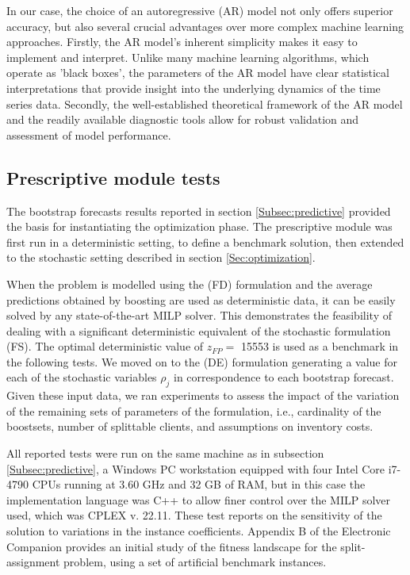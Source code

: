 \documentclass[ijoc,sglanonrev]{informs4}
\begin{document}
In our case, the choice of an autoregressive (AR) model not only offers superior accuracy, but also several crucial advantages over more complex machine learning approaches. Firstly, the AR model's inherent simplicity makes it easy to implement and interpret.  Unlike many machine learning algorithms, which operate as 'black boxes', the parameters of the AR model have clear statistical interpretations that provide insight into the underlying dynamics of the time series data. Secondly, the well-established theoretical framework of the AR model and the readily available diagnostic tools allow for robust validation and assessment of model performance.  

\subsection{Prescriptive module tests}  \label{Subsec:prescriptive}

The bootstrap forecasts results reported in section \ref{Subsec:predictive} provided the basis for instantiating the optimization phase. The prescriptive module was first run in a deterministic setting, to define a benchmark solution, then extended to the stochastic setting described in section \ref{Sec:optimization}.

When the problem is modelled using the (FD) formulation and the average predictions obtained by boosting are used as deterministic data, it can be easily solved by any state-of-the-art MILP solver. This demonstrates the feasibility of dealing with a significant deterministic equivalent of the stochastic formulation (FS). The optimal deterministic value of $z_{FP} =$ 15553 is used as a benchmark in the following tests.
We moved on to the (DE) formulation generating a value for each of the stochastic variables $\rho_j$ in correspondence to each bootstrap forecast.
Given these input data, we ran experiments to assess the impact of the variation of the remaining sets of parameters of the formulation, i.e., cardinality of the boostsets, number of splittable clients, and assumptions on inventory costs. 

All reported tests were run on the same machine as in subsection \ref{Subsec:predictive}, a Windows PC workstation equipped with four Intel Core i7-4790 CPUs running at 3.60 GHz and 32 GB of RAM, but in this case the implementation language was C++ to allow finer control over the MILP solver used, which was CPLEX v. 22.11.
These test reports on the sensitivity of the solution to variations in the instance coefficients. Appendix B of the Electronic Companion provides an initial study of the fitness landscape for the split-assignment problem, using a set of artificial benchmark instances.
\end{document}
